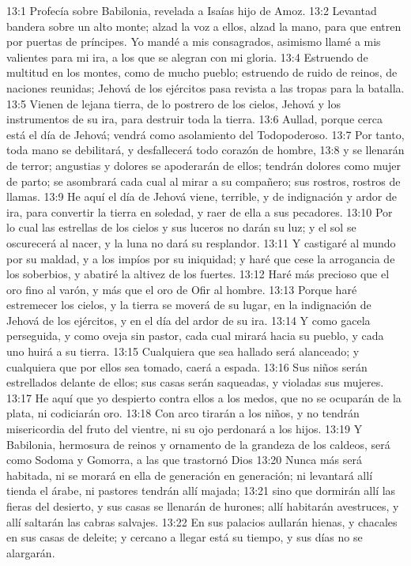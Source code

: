 13:1 Profecía sobre Babilonia, revelada a Isaías hijo de Amoz. 
13:2 Levantad bandera sobre un alto monte; alzad la voz a ellos, alzad la mano, para que entren por puertas de príncipes. Yo mandé a mis consagrados, asimismo llamé a mis valientes para mi ira, a los que se alegran con mi gloria. 
13:4 Estruendo de multitud en los montes, como de mucho pueblo; estruendo de ruido de reinos, de naciones reunidas; Jehová de los ejércitos pasa revista a las tropas para la batalla. 
13:5 Vienen de lejana tierra, de lo postrero de los cielos, Jehová y los instrumentos de su ira, para destruir toda la tierra. 
13:6 Aullad, porque cerca está el día de Jehová; vendrá como asolamiento del Todopoderoso. 
13:7 Por tanto, toda mano se debilitará, y desfallecerá todo corazón de hombre, 
13:8 y se llenarán de terror; angustias y dolores se apoderarán de ellos; tendrán dolores como mujer de parto; se asombrará cada cual al mirar a su compañero; sus rostros, rostros de llamas. 
13:9 He aquí el día de Jehová viene, terrible, y de indignación y ardor de ira, para convertir la tierra en soledad, y raer de ella a sus pecadores. 
13:10 Por lo cual las estrellas de los cielos y sus luceros no darán su luz; y el sol se oscurecerá al nacer, y la luna no dará su resplandor. 
13:11 Y castigaré al mundo por su maldad, y a los impíos por su iniquidad; y haré que cese la arrogancia de los soberbios, y abatiré la altivez de los fuertes. 
13:12 Haré más precioso que el oro fino al varón, y más que el oro de Ofir al hombre. 
13:13 Porque haré estremecer los cielos, y la tierra se moverá de su lugar, en la indignación de Jehová de los ejércitos, y en el día del ardor de su ira. 
13:14 Y como gacela perseguida, y como oveja sin pastor, cada cual mirará hacia su pueblo, y cada uno huirá a su tierra. 
13:15 Cualquiera que sea hallado será alanceado; y cualquiera que por ellos sea tomado, caerá a espada. 
13:16 Sus niños serán estrellados delante de ellos; sus casas serán saqueadas, y violadas sus mujeres. 
13:17 He aquí que yo despierto contra ellos a los medos, que no se ocuparán de la plata, ni codiciarán oro. 
13:18 Con arco tirarán a los niños, y no tendrán misericordia del fruto del vientre, ni su ojo perdonará a los hijos. 
13:19 Y Babilonia, hermosura de reinos y ornamento de la grandeza de los caldeos, será como Sodoma y Gomorra, a las que trastornó Dios 
13:20 Nunca más será habitada, ni se morará en ella de generación en generación; ni levantará allí tienda el árabe, ni pastores tendrán allí majada; 
13:21 sino que dormirán allí las fieras del desierto, y sus casas se llenarán de hurones; allí habitarán avestruces, y allí saltarán las cabras salvajes. 
13:22 En sus palacios aullarán hienas, y chacales en sus casas de deleite; y cercano a llegar está su tiempo, y sus días no se alargarán. 
